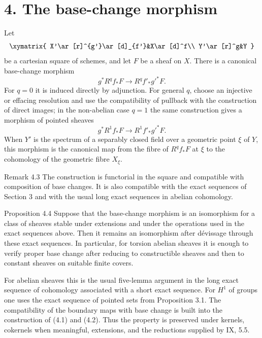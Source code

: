 \section*{4. The base-change morphism}
Let
\[
\xymatrix{
X'\ar[r]^{g'}\ar[d]_{f'}&X\ar[d]^f\\
Y'\ar[r]^g&Y
}
\]
be a cartesian square of schemes, and let \(F\) be a sheaf on \(X\). There is a canonical base-change morphism
\[
g^*R^qf_*F\longrightarrow R^qf'_*g'^*F.
\tag{4.1}
\]
For \(q=0\) it is induced directly by adjunction. For general \(q\), choose an injective or effacing resolution and use the compatibility of pullback with the construction of direct images; in the non-abelian case \(q=1\) the same construction gives a morphism of pointed sheaves
\[
g^*R^1f_*F\longrightarrow R^1f'_*g'^*F.
\tag{4.2}
\]
When \(Y'\) is the spectrum of a separably closed field over a geometric point \(\xi\) of \(Y\), this morphism is the canonical map from the fibre of \(R^qf_*F\) at \(\xi\) to the cohomology of the geometric fibre \(X_\xi\).

\begin{remarktext}{Remark 4.3}
The construction is functorial in the square and compatible with composition of base changes. It is also compatible with the exact sequences of Section 3 and with the usual long exact sequences in abelian cohomology.
\end{remarktext}

\begin{statement}{Proposition 4.4}
Suppose that the base-change morphism is an isomorphism for a class of sheaves stable under extensions and under the operations used in the exact sequences above. Then it remains an isomorphism after dévissage through these exact sequences. In particular, for torsion abelian sheaves it is enough to verify proper base change after reducing to constructible sheaves and then to constant sheaves on suitable finite covers.
\end{statement}

\begin{prooftext}
For abelian sheaves this is the usual five-lemma argument in the long exact sequence of cohomology associated with a short exact sequence. For \(H^1\) of groups one uses the exact sequence of pointed sets from Proposition 3.1. The compatibility of the boundary maps with base change is built into the construction of (4.1) and (4.2). Thus the property is preserved under kernels, cokernels when meaningful, extensions, and the reductions supplied by IX, 5.5.
\end{prooftext}

